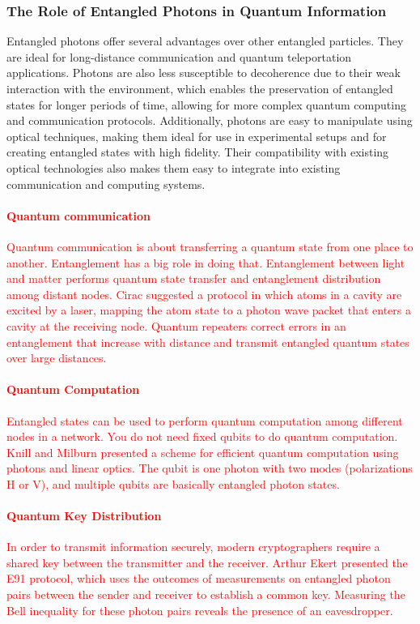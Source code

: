 \subsubsection{The Role of Entangled Photons in Quantum Information}
Entangled photons offer several advantages over other entangled particles. They are ideal for long-distance communication and quantum teleportation applications. Photons are also less susceptible to decoherence due to their weak interaction with the environment, which enables the preservation of entangled states for longer periods of time, allowing for more complex quantum computing and communication protocols. Additionally, photons are easy to manipulate using optical techniques, making them ideal for use in experimental setups and for creating entangled states with high fidelity. Their compatibility with existing optical technologies also makes them easy to integrate into existing communication and computing systems.







\textcolor{red}{
\paragraph{Quantum communication}
Quantum communication is about transferring a quantum state from one place to another. Entanglement has a big role in doing that. Entanglement between light and matter performs quantum state transfer and entanglement distribution among distant nodes. Cirac \cite{Circ1997} suggested a protocol in which atoms in a cavity are excited by a laser, mapping the atom state to a photon wave packet that enters a cavity at the receiving node. Quantum repeaters \cite{Briegel1997} correct errors in an entanglement that increase with distance and transmit entangled quantum states over large distances.
\paragraph{Quantum Computation}
Entangled states can be used to perform quantum computation among different nodes in a network. You do not need fixed qubits to do quantum computation. Knill and Milburn \cite{Knill2001} presented a scheme for efficient quantum computation using photons and linear optics. The qubit is one photon with two modes (polarizations H or V), and multiple qubits are basically entangled photon states.
\paragraph{Quantum Key Distribution}
In order to transmit information securely, modern cryptographers require a shared key between the transmitter and the receiver. Arthur Ekert \cite{Ekert1991} presented the E91 protocol, which uses the outcomes of measurements on entangled photon pairs between the sender and receiver to establish a common key. Measuring the Bell inequality for these photon pairs reveals the presence of an eavesdropper.
}
